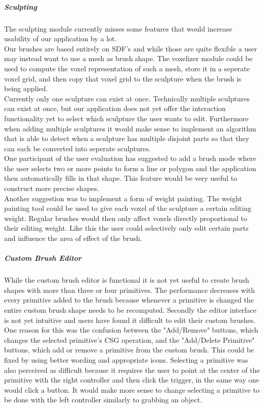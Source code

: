 \subparagraph{Sculpting}
The sculpting module currently misses some features that would increase usability of our application by a lot.\\
Our brushes are based entirely on SDF's and while those are quite flexible a user may instead want to use a mesh as brush shape. The voxelizer module could be used to compute the voxel representation of such a mesh, store it in a seperate voxel grid, and then copy that voxel grid to the sculpture when the brush is being applied.\\
Currently only one sculpture can exist at once. Technically multiple sculptures can exist at once, but our application does not yet offer the interaction functionality yet to select which sculpture the user wants to edit. Furthermore when adding multiple sculptures it would make sense to implement an algorithm that is able to detect when a sculpture has multiple disjoint parts so that they can each be converted into seperate sculptures.\\
One participant of the user evaluation has suggested to add a brush mode where the user selects two or more points to form a line or polygon and the application then automatically fills in that shape. This feature would be very useful to construct more precise shapes.\\
Another suggestion was to implement a form of weight painting. The weight painting tool could be used to give each voxel of the sculpture a certain editing weight. Regular brushes would then only affect voxels directly proportional to their editing weight. Like this the user could selectively only edit certain parts and influence the area of effect of the brush.

\subparagraph{Custom Brush Editor}
While the custom brush editor is functional it is not yet useful to create brush shapes with more than three or four primitives. The performance decreases with every primitive added to the brush because whenever a primitive is changed the entire custom brush shape needs to be recomputed. Secondly the editor interface is not yet intuitive and users have found it difficult to edit their custom brushes. One reason for this was the confusion between the "Add/Remove" buttons, which changes the selected primitive's CSG operation, and the "Add/Delete Primitive" buttons, which add or remove a primitive from the custom brush. This could be fixed by using better wording and appropriate icons. Selecting a primitive was also perceived as difficult because it requires the user to point at the center of the primitive with the right controller and then click the trigger, in the same way one would click a button. It would make more sense to change selecting a primitive to be done with the left controller similarly to grabbing an object.

